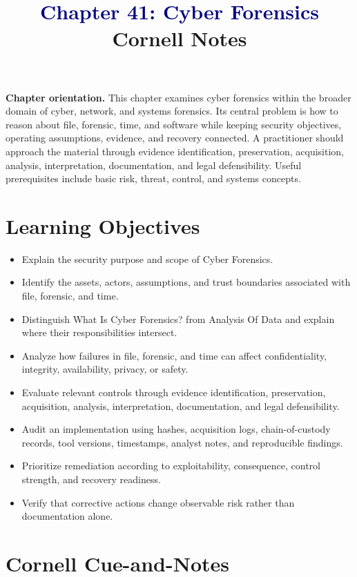 \documentclass[11pt]{article}
\title{\textcolor{Navy}{Chapter 41: Cyber Forensics}\\[2mm]\large Cornell Notes}
\author{}
\date{}
\begin{document}
\maketitle
\thispagestyle{fancy}
\vspace{-1.5em}
\begin{orientationbox}
\textbf{Chapter orientation.} This chapter examines cyber forensics within the broader domain of cyber, network, and systems forensics. Its central problem is how to reason about file, forensic, time, and software while keeping security objectives, operating assumptions, evidence, and recovery connected. A practitioner should approach the material through evidence identification, preservation, acquisition, analysis, interpretation, documentation, and legal defensibility. Useful prerequisites include basic risk, threat, control, and systems concepts.
\end{orientationbox}
\section*{Learning Objectives}
\begin{itemize}
\item Explain the security purpose and scope of Cyber Forensics.
\item Identify the assets, actors, assumptions, and trust boundaries associated with file, forensic, and time.
\item Distinguish What Is Cyber Forensics? from Analysis Of Data and explain where their responsibilities intersect.
\item Analyze how failures in file, forensic, and time can affect confidentiality, integrity, availability, privacy, or safety.
\item Evaluate relevant controls through evidence identification, preservation, acquisition, analysis, interpretation, documentation, and legal defensibility.
\item Audit an implementation using hashes, acquisition logs, chain-of-custody records, tool versions, timestamps, analyst notes, and reproducible findings.
\item Prioritize remediation according to exploitability, consequence, control strength, and recovery readiness.
\item Verify that corrective actions change observable risk rather than documentation alone.
\end{itemize}
\section*{Cornell Cue-and-Notes}
\end{document}

